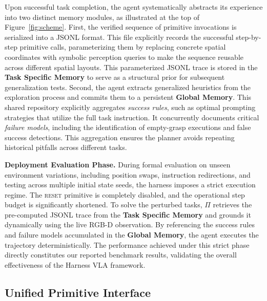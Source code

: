 \documentclass{article}
\begin{document}
Upon successful task completion, the agent systematically abstracts its experience into two distinct memory modules, as illustrated at the top of Figure~\ref{fig:scheme}. First, the verified sequence of primitive invocations is serialized into a JSONL format. This file explicitly records the successful step-by-step primitive calls, parameterizing them by replacing concrete spatial coordinates with symbolic perception queries to make the sequence reusable across different spatial layouts. This parameterized JSONL trace is stored in the \textbf{Task Specific Memory} to serve as a structural prior for subsequent generalization tests. Second, the agent extracts generalized heuristics from the exploration process and commits them to a persistent \textbf{Global Memory}. This shared repository explicitly aggregates \emph{success rules}, such as optimal prompting strategies that utilize the full task instruction. It concurrently documents critical \emph{failure models}, including the identification of empty-grasp executions and false success detections. This aggregation ensures the planner avoids repeating historical pitfalls across different tasks.

\textbf{Deployment Evaluation Phase.} During formal evaluation on unseen environment variations, including position swaps, instruction redirections, and testing across multiple initial state seeds, the harness imposes a strict execution regime. The \textsc{reset} primitive is completely disabled, and the operational step budget is significantly shortened. To solve the perturbed tasks, $\Pi$ retrieves the pre-computed JSONL trace from the \textbf{Task Specific Memory} and grounds it dynamically using the live RGB-D observation. By referencing the success rules and failure models accumulated in the \textbf{Global Memory}, the agent executes the trajectory deterministically. The performance achieved under this strict phase directly constitutes our reported benchmark results, validating the overall effectiveness of the Harness VLA framework.

	\subsection{Unified Primitive Interface}
	\label{sec:method:primitives}
\end{document}
